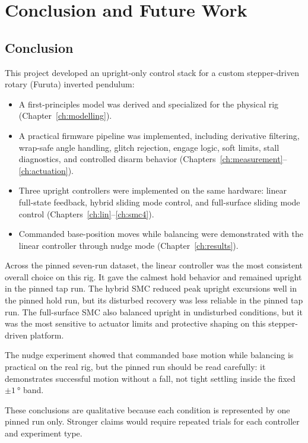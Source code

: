 \chapter{Conclusion and Future Work}

\section{Conclusion}
This project developed an upright-only control stack for a custom stepper-driven rotary (Furuta) inverted pendulum:
\begin{itemize}
  \item A first-principles model was derived and specialized for the physical rig (Chapter~\ref{ch:modelling}).
  \item A practical firmware pipeline was implemented, including derivative filtering, wrap-safe angle handling, glitch rejection, engage logic, soft limits, stall diagnostics, and controlled disarm behavior (Chapters~\ref{ch:measurement}--\ref{ch:actuation}).
  \item Three upright controllers were implemented on the same hardware: linear full-state feedback, hybrid sliding mode control, and full-surface sliding mode control (Chapters~\ref{ch:lin}--\ref{ch:smc4}).
  \item Commanded base-position moves while balancing were demonstrated with the linear controller through nudge mode (Chapter~\ref{ch:results}).
\end{itemize}

Across the pinned seven-run dataset, the linear controller was the most consistent overall choice on this rig. It gave the calmest hold behavior and remained upright in the pinned tap run. The hybrid SMC reduced peak upright excursions well in the pinned hold run, but its disturbed recovery was less reliable in the pinned tap run. The full-surface SMC also balanced upright in undisturbed conditions, but it was the most sensitive to actuator limits and protective shaping on this stepper-driven platform.

The nudge experiment showed that commanded base motion while balancing is practical on the real rig, but the pinned run should be read carefully: it demonstrates successful motion without a fall, not tight settling inside the fixed $\pm\SI{1}{\degree}$ band.

These conclusions are qualitative because each condition is represented by one pinned run only. Stronger claims would require repeated trials for each controller and experiment type.

